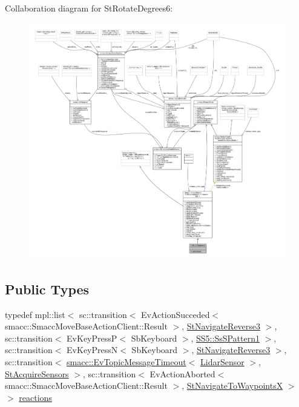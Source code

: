 Collaboration diagram for St\+Rotate\+Degrees6\+:
\nopagebreak
\begin{figure}[H]
\begin{center}
\leavevmode
\includegraphics[width=350pt]{structStRotateDegrees6__coll__graph}
\end{center}
\end{figure}
\subsection*{Public Types}
\begin{DoxyCompactItemize}
\item 
typedef mpl\+::list$<$ sc\+::transition$<$ Ev\+Action\+Succeded$<$ smacc\+::\+Smacc\+Move\+Base\+Action\+Client\+::\+Result $>$, \hyperlink{structStNavigateReverse3}{St\+Navigate\+Reverse3} $>$, sc\+::transition$<$ Ev\+Key\+PressP$<$ Sb\+Keyboard $>$, \hyperlink{structSS5_1_1SsSPattern1}{S\+S5\+::\+Ss\+S\+Pattern1} $>$, sc\+::transition$<$ Ev\+Key\+PressN$<$ Sb\+Keyboard $>$, \hyperlink{structStNavigateReverse3}{St\+Navigate\+Reverse3} $>$, sc\+::transition$<$ \hyperlink{structsmacc_1_1EvTopicMessageTimeout}{smacc\+::\+Ev\+Topic\+Message\+Timeout}$<$ \hyperlink{sensor__state_8h_a9db9e1944f88de79507758d08e4a2ee3}{Lidar\+Sensor} $>$, \hyperlink{structStAcquireSensors}{St\+Acquire\+Sensors} $>$, sc\+::transition$<$ Ev\+Action\+Aborted$<$ smacc\+::\+Smacc\+Move\+Base\+Action\+Client\+::\+Result $>$, \hyperlink{structStNavigateToWaypointsX}{St\+Navigate\+To\+WaypointsX} $>$ $>$ \hyperlink{structStRotateDegrees6_aa9923171ad502aeb03612b182d8d73ea}{reactions}
\end{DoxyCompactItemize}
